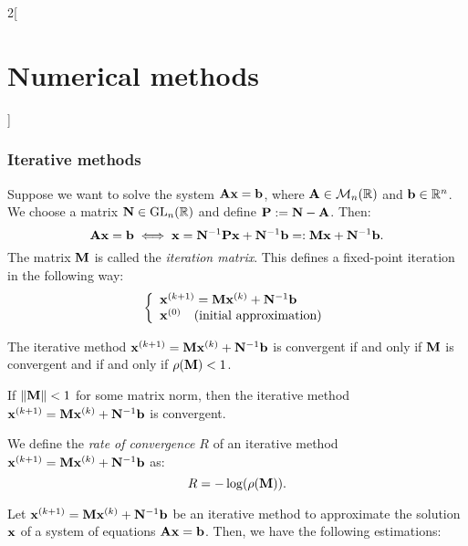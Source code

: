 \documentclass[../../../main.tex]{subfiles}
\begin{document}
\begin{multicols}{2}[\section{Numerical methods}]
\subsubsection*{Iterative methods}
\begin{definition}
    Suppose we want to solve the system $\vb{A}\vb{x}=\vb{b}$, where $\vb{A}\in\mathcal{M}_n(\mathbb{R})$ and $\vb{b}\in\mathbb{R}^n$. We choose a matrix $\vb{N}\in\mathrm{GL}_n(\mathbb{R})$ and define $\vb{P}:=\vb{N}-\vb{A}$. Then: $$\vb{A}\vb{x}=\vb{b}\iff \vb{x}=\vb{N}^{-1}\vb{P}\vb{x}+\vb{N}^{-1}\vb{b}=:\vb{M}\vb{x}+\vb{N}^{-1}\vb{b}.$$ The matrix $\vb{M}$ is called the \textit{iteration matrix}. This defines a fixed-point iteration in the following way:
    \begin{equation*}
        \left\{
        \begin{array}{l}
            \vb{x}^{(k+1)}=\vb{M}\vb{x}^{(k)}+\vb{N}^{-1}\vb{b}\\
            \vb{x}^{(0)}\quad\text{(initial approximation)}
        \end{array}\right.
    \end{equation*}
\end{definition}
\begin{theorem}
    The iterative method $\vb{x}^{(k+1)}=\vb{M}\vb{x}^{(k)}+\vb{N}^{-1}\vb{b}$ is convergent if and only if $\vb{M}$ is convergent and if and only if $\rho(\vb{M})<1$.
\end{theorem}
\begin{corollary}
    If $\|\vb{M}\|<1$ for some matrix norm, then the iterative method $\vb{x}^{(k+1)}=\vb{M}\vb{x}^{(k)}+\vb{N}^{-1}\vb{b}$ is convergent.
\end{corollary}
\begin{definition}
    We define the \textit{rate of convergence $R$} of an iterative method $\vb{x}^{(k+1)}=\vb{M}\vb{x}^{(k)}+\vb{N}^{-1}\vb{b}$ as: $$R=-\log(\rho(\vb{M})).$$
\end{definition}
\begin{prop}
    Let $\vb{x}^{(k+1)}=\vb{M}\vb{x}^{(k)}+\vb{N}^{-1}\vb{b}$ be an iterative method to approximate the solution $\vb{x}$ of a system of equations $\vb{A}\vb{x}=\vb{b}$. Then, we have the following estimations:

\end{prop}
\end{multicols}
\end{document}
